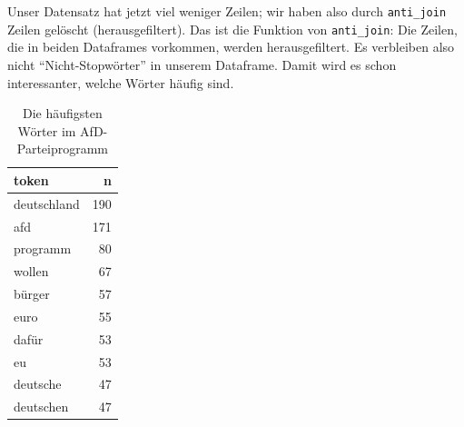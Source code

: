 \documentclass[12pt,ngerman,]{book}
\makeatletter
\newenvironment{Shaded}{\begin{snugshade}}{\end{snugshade}}
\newcommand{\KeywordTok}[1]{\textcolor[rgb]{0.13,0.29,0.53}{\textbf{{#1}}}}
\newcommand{\DataTypeTok}[1]{\textcolor[rgb]{0.13,0.29,0.53}{{#1}}}
\newcommand{\StringTok}[1]{\textcolor[rgb]{0.31,0.60,0.02}{{#1}}}
\newcommand{\CommentTok}[1]{\textcolor[rgb]{0.56,0.35,0.01}{\textit{{#1}}}}
\newcommand{\OtherTok}[1]{\textcolor[rgb]{0.56,0.35,0.01}{{#1}}}
\newcommand{\NormalTok}[1]{{#1}}
\newenvironment{kframe}{%
\medskip{}
\setlength{\fboxsep}{.8em}
 \def\at@end@of@kframe{}%
 \ifinner\ifhmode%
  \def\at@end@of@kframe{\end{minipage}}%
  \begin{minipage}{\columnwidth}%
 \fi\fi%
 \def\FrameCommand##1{\hskip\@totalleftmargin \hskip-\fboxsep
 \colorbox{shadecolor}{##1}\hskip-\fboxsep
     \hskip-\linewidth \hskip-\@totalleftmargin \hskip\columnwidth}%
 \MakeFramed {\advance\hsize-\width
   \@totalleftmargin\z@ \linewidth\hsize
   \@setminipage}}%
 {\par\unskip\endMakeFramed%
 \at@end@of@kframe}
\renewenvironment{Shaded}{\begin{kframe}}{\end{kframe}}
\theoremstyle{definition}
\theoremstyle{definition}
\theoremstyle{remark}
\makeatother
\begin{document}
\begin{Shaded}
\end{Shaded}

Unser Datensatz hat jetzt viel weniger Zeilen; wir haben also durch
\texttt{anti\_join} Zeilen gelöscht (herausgefiltert). Das ist die
Funktion von \texttt{anti\_join}: Die Zeilen, die in beiden Dataframes
vorkommen, werden herausgefiltert. Es verbleiben also nicht
``Nicht-Stopwörter'' in unserem Dataframe. Damit wird es schon
interessanter, welche Wörter häufig sind.

\begin{Shaded}
\end{Shaded}

\begin{table}

\caption{\label{tab:unnamed-chunk-16}Die häufigsten Wörter im AfD-Parteiprogramm}
\centering
\begin{tabular}[t]{l|r}
\hline
token & n\\
\hline
deutschland & 190\\
\hline
afd & 171\\
\hline
programm & 80\\
\hline
wollen & 67\\
\hline
bürger & 57\\
\hline
euro & 55\\
\hline
dafür & 53\\
\hline
eu & 53\\
\hline
deutsche & 47\\
\hline
deutschen & 47\\
\hline
\end{tabular}
\end{table}
\end{document}
